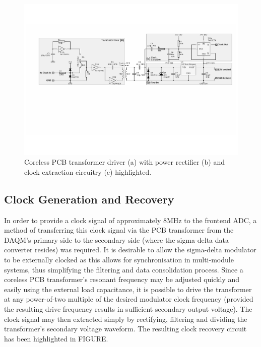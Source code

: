 \documentclass[conference]{IEEEtran}
\begin{document}
	\begin{figure}[t]
		\centering
		\includegraphics[width=1.0\textwidth]{./img/TFpwrclk_BW}
		\caption{Coreless PCB transformer driver (a) with power rectifier (b) and clock extraction circuitry (c) highlighted.}
		\label{fig:TFpwrclk_BW}
	\end{figure}	
	
	\subsection{Clock Generation and Recovery} %
	In order to provide a clock signal of approximately 8MHz to the frontend ADC, a method of transferring this clock signal via the PCB transformer from the DAQM's primary side to the secondary side (where the sigma-delta data converter resides) was required.  It is desirable to allow the sigma-delta modulator to be externally clocked as this allows for synchronisation in multi-module systems, thus simplifying the filtering and data consolidation process.  Since a coreless PCB transformer's resonant frequency may be adjusted quickly and easily using the external load capacitance, it is possible to drive the transformer at any power-of-two multiple of the desired modulator clock frequency (provided the resulting drive frequency results in sufficient secondary output voltage).  The clock signal may then extracted simply by rectifying, filtering and dividing the transformer's secondary voltage waveform.  The resulting clock recovery circuit has been highlighted in FIGURE.
	
\end{document}
